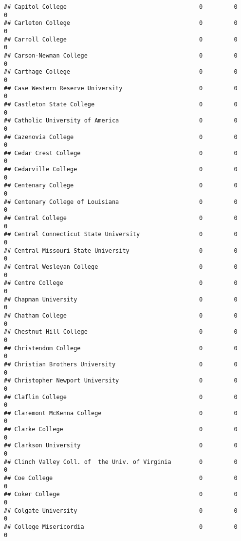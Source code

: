 \documentclass[
]{article}
\begin{document}
\begin{verbatim}
## Capitol College                                      0         0           0
## Carleton College                                     0         0           0
## Carroll College                                      0         0           0
## Carson-Newman College                                0         0           0
## Carthage College                                     0         0           0
## Case Western Reserve University                      0         0           0
## Castleton State College                              0         0           0
## Catholic University of America                       0         0           0
## Cazenovia College                                    0         0           0
## Cedar Crest College                                  0         0           0
## Cedarville College                                   0         0           0
## Centenary College                                    0         0           0
## Centenary College of Louisiana                       0         0           0
## Central College                                      0         0           0
## Central Connecticut State University                 0         0           0
## Central Missouri State University                    0         0           0
## Central Wesleyan College                             0         0           0
## Centre College                                       0         0           0
## Chapman University                                   0         0           0
## Chatham College                                      0         0           0
## Chestnut Hill College                                0         0           0
## Christendom College                                  0         0           0
## Christian Brothers University                        0         0           0
## Christopher Newport University                       0         0           0
## Claflin College                                      0         0           0
## Claremont McKenna College                            0         0           0
## Clarke College                                       0         0           0
## Clarkson University                                  0         0           0
## Clinch Valley Coll. of  the Univ. of Virginia        0         0           0
## Coe College                                          0         0           0
## Coker College                                        0         0           0
## Colgate University                                   0         0           0
## College Misericordia                                 0         0           0

\end{verbatim}
\end{document}
